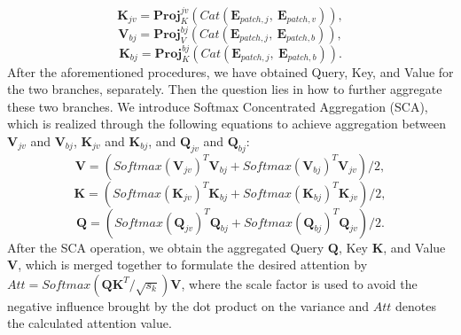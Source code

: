 \documentclass[lettersize,journal]{IEEEtran}
\begin{document}
\begin{equation}
    \mathbf{K}_{jv} = \mathbf{Proj}_{K}^{jv}(Cat(\mathbf{E}_{patch,j},~ \mathbf{E}_{patch,v})),
\end{equation}
\begin{equation}
    \mathbf{V}_{bj} = \mathbf{Proj}_{V}^{bj}(Cat(\mathbf{E}_{patch,j},~ \mathbf{E}_{patch,b})),
\end{equation}
\begin{equation}
    \mathbf{K}_{bj} = \mathbf{Proj}_{K}^{bj}(Cat(\mathbf{E}_{patch,j},~ \mathbf{E}_{patch,b})).
\end{equation}
After the aforementioned procedures, we have obtained Query, Key, and Value for the two branches, separately.
Then the question lies in how to further aggregate these two branches.
We introduce Softmax Concentrated Aggregation (SCA), which is realized through the following equations to achieve aggregation between $\mathbf{V}_{jv}$ and $\mathbf{V}_{bj}$, $\mathbf{K}_{jv}$ and $\mathbf{K}_{bj}$, and $\mathbf{Q}_{jv}$ and $\mathbf{Q}_{bj}$:
\begin{equation}
    \mathbf{V} = (Softmax(\mathbf{V}_{jv})^{T}\mathbf{V}_{bj} + Softmax(\mathbf{V}_{bj})^T\mathbf{V}_{jv})/2,
\end{equation}
\begin{equation}
    \mathbf{K} = (Softmax(\mathbf{K}_{jv})^{T}\mathbf{K}_{bj} + Softmax(\mathbf{K}_{bj})^T\mathbf{K}_{jv})/2,
\end{equation}
\begin{equation}
    \mathbf{Q} = (Softmax(\mathbf{Q}_{jv})^{T}\mathbf{Q}_{bj} + Softmax(\mathbf{Q}_{bj})^T\mathbf{Q}_{jv})/2.
\end{equation}
After the SCA operation, we obtain the aggregated Query $\mathbf{Q}$, Key $\mathbf{K}$, and Value $\mathbf{V}$, which is merged together to formulate the desired attention by $Att = Softmax(\mathbf{Q}\mathbf{K}^T/\sqrt{s_k})\mathbf{V}$, where the scale factor is used to avoid the negative influence brought by the dot product on the variance and $Att$ denotes the calculated attention value.
\setlength{\textfloatsep}{5pt}
\end{document}
